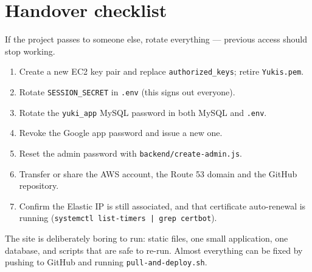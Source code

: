 \documentclass[11pt,a4paper]{article}
\newcommand{\code}[1]{\texttt{\small #1}}
\begin{document}
\section{Handover checklist}

If the project passes to someone else, rotate everything --- previous access
should stop working.

\begin{enumerate}
  \item Create a new EC2 key pair and replace \code{authorized\_keys};
        retire \code{Yukis.pem}.
  \item Rotate \code{SESSION\_SECRET} in \code{.env} (this signs out everyone).
  \item Rotate the \code{yuki\_app} MySQL password in both MySQL and
        \code{.env}.
  \item Revoke the Google app password and issue a new one.
  \item Reset the admin password with \code{backend/create-admin.js}.
  \item Transfer or share the AWS account, the Route 53 domain and the GitHub
        repository.
  \item Confirm the Elastic IP is still associated, and that certificate
        auto-renewal is running (\code{systemctl list-timers | grep certbot}).
\end{enumerate}

\vspace{1.5em}
\noindent{\color{gold}\rule{\linewidth}{0.6pt}}
\vspace{0.6em}

\noindent\small\color{soft}
The site is deliberately boring to run: static files, one small application,
one database, and scripts that are safe to re-run. Almost everything can be
fixed by pushing to GitHub and running \code{pull-and-deploy.sh}.
\end{document}
